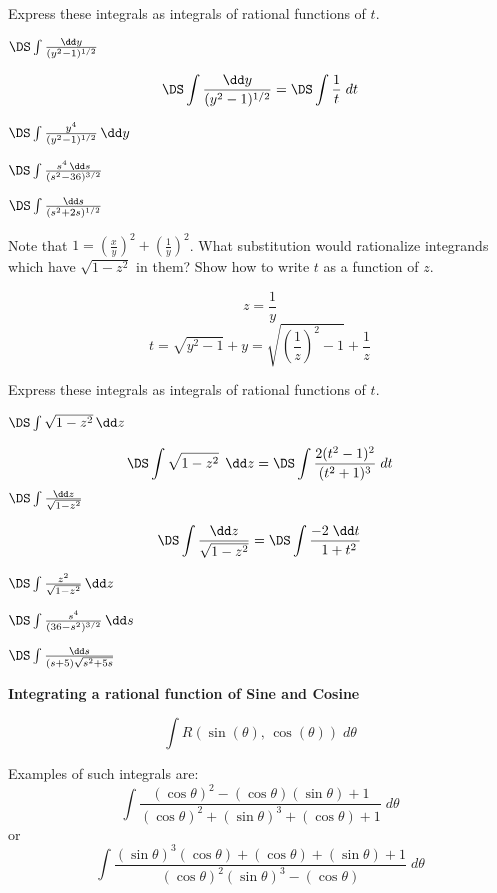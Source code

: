 Express these integrals as integrals of
rational functions of $t$.

\problem \(\DS \int \frac{\dd y}{(y^2-1)^{1/2}} \)

\answer
\[ \DS \int \frac{\dd y}{(y^2-1)^{1/2}} =
\DS \int \frac1t \;dt
\]
\endanswer

\problem \(\DS \int \frac{y^4}{(y^2 -1)^{1/2}}\, \dd y  \)

\problem \(\DS \int \frac{s^4\, \dd s }{(s^2 -36)^{3/2}} \)

\problem \(\DS \int \frac{\dd s}{(s^2+2s)^{1/2}} \)


\problem Note that $1=(\frac{x}y)^2+(\frac1{y})^2$.
What substitution would rationalize
integrands which have $\sqrt{1-z^2}$ in them?
Show how to write $t$ as a function of $z$.

\answer
\[z=\frac1{y}\]
\[t=\sqrt{y^2-1}+y=\sqrt{(\frac1z)^2-1}+\frac1z\]
\endanswer

Express these integrals as integrals of
rational functions of $t$.

\problem \(\DS \int \sqrt{1-z^2}\, \dd z  \)

\answer
\[
\DS \int \sqrt{1-z^2}\,\; \dd z=
\DS \int \frac{2(t^2-1)^2}{(t^2+1)^3} \;dt
\]
\endanswer
\problem \(\DS \int \frac{ \dd z }{\sqrt{1-z^2}}\, \)

\answer
\[\DS \int \frac{ \dd z }{\sqrt{1-z^2}} =
\DS \int \frac{-2 \;\dd t }{\;\;1+t^2}\]
\endanswer

\problem \(\DS \int \frac{z^2}{\sqrt{1-z^2}}\, \dd z  \)

\problem \(\DS \int \frac{s^4}{(36-s^2)^{3/2}} \, \dd s\)

\problem \(\DS \int \frac{\dd s}{(s+5)\sqrt{s^2 + 5s}}\)



\bigskip

\begin{center}
  \textbf{Integrating a rational function of Sine and Cosine}
\end{center}
\[
\int R(\sin(\theta),\, \cos(\theta))\; d\theta
\]



\bigskip
Examples of such integrals are:
\[
\int \frac{(\cos\theta)^2-(\cos\theta)(\sin\theta)+1}
{(\cos\theta)^2+(\sin\theta)^3+
(\cos\theta)+1}\; d \theta
\]
or
\[
\int \frac{(\sin\theta)^3(\cos\theta) + (\cos\theta) +(\sin\theta) + 1}
{(\cos\theta)^2(\sin\theta)^3-(\cos\theta)}\; d \theta
\]

